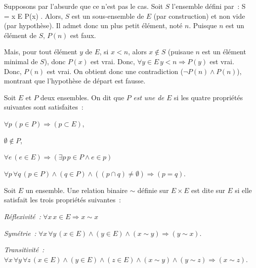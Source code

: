 \blank[medium]

\noindent{} 
    Supposons par l'absurde que ce n'est pas le cas. 
    Soit $S$ l'ensemble défini par : 
    \startformula
        S = \left\lbrace x \in E \middle \vert \lnot P(x) \right\rbrace.
    \stopformula
    Alors, $S$ est un sous-ensemble de $E$ (par construction) et non vide (par hypothèse).
    Il admet donc un plus petit élément, noté $n$.
    Puisque $n$ est un élément de $S$, $P(n)$ est faux.

    Mais, pour tout élément $y$ de $E$, si $x < n$, alors $x \notin S$ (puisaue $n$ est un élément minimal de $S$), donc $P(x)$ est vrai.
    Donc, $\forall y \in E \, y < n \Rightarrow P(y)$ est vrai.
    Donc, $P(n)$ est vrai.
    On obtient donc une contradiction ($\lnot P(n) \wedge P(n)$), montrant que l'hypothèse de départ est fausse.

    \done

\stopsubsection

\startsubsection[title=Partition] 

Soit $E$ et $P$ deux ensembles. 
On dit que \emph{$P$ est une  de $E$} si les quatre propriétés suivantes sont satisfaites : 
\startitemize[nowhite]
    \item $\forall p \, (p \in P) \Rightarrow (p \subset E)$, 
    \item $\emptyset \notin P$, 
    \item $\forall e \, (e \in E) \Rightarrow (\exists p \, p \in P \wedge e \in p)$
    \item $\forall p \, \forall q \, (p \in P) \wedge (q \in P) \wedge ((p \cap q) \neq \emptyset) \Rightarrow (p = q)$. 
\stopitemize

\stopsubsection

\startsubsection[title=Relation d'équivalence]

Soit $E$ un ensemble. 
Une relation binaire $\sim$ définie sur $E \times E$ est dite \emph{} sur $E$ si elle satisfait les trois propriétés suivantes : 
\startitemize[nowhite]
    \item \emph{Réflexivité :} $\forall x \, x \in E \Rightarrow x \sim x$
    \item \emph{Symétrie :} $\forall x \, \forall y \, (x \in E) \wedge (y \in E) \wedge (x \sim y) \Rightarrow (y \sim x)$.
    \item \emph{Transitivité :} $\forall x \, \forall y \, \forall z \, (x \in E) \wedge (y \in E) \wedge (z \in E) \wedge (x \sim y) \wedge (y \sim z) \Rightarrow (x \sim z)$. 
\stopitemize


